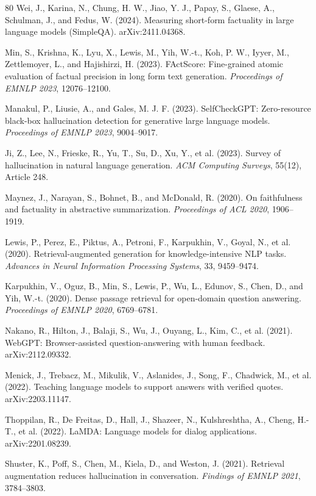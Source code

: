 \documentclass[11pt,a4paper]{article}
\begin{document}
\begin{thebibliography}{80}
Wei, J., Karina, N., Chung, H. W., Jiao, Y. J., Papay, S., Glaese, A., Schulman, J., and Fedus, W. (2024). Measuring short-form factuality in large language models (SimpleQA). arXiv:2411.04368.

Min, S., Krishna, K., Lyu, X., Lewis, M., Yih, W.-t., Koh, P. W., Iyyer, M., Zettlemoyer, L., and Hajishirzi, H. (2023). FActScore: Fine-grained atomic evaluation of factual precision in long form text generation. \textit{Proceedings of EMNLP 2023}, 12076--12100.

Manakul, P., Liusie, A., and Gales, M. J. F. (2023). SelfCheckGPT: Zero-resource black-box hallucination detection for generative large language models. \textit{Proceedings of EMNLP 2023}, 9004--9017.

Ji, Z., Lee, N., Frieske, R., Yu, T., Su, D., Xu, Y., et al. (2023). Survey of hallucination in natural language generation. \textit{ACM Computing Surveys}, 55(12), Article 248.

Maynez, J., Narayan, S., Bohnet, B., and McDonald, R. (2020). On faithfulness and factuality in abstractive summarization. \textit{Proceedings of ACL 2020}, 1906--1919.

Lewis, P., Perez, E., Piktus, A., Petroni, F., Karpukhin, V., Goyal, N., et al. (2020). Retrieval-augmented generation for knowledge-intensive NLP tasks. \textit{Advances in Neural Information Processing Systems}, 33, 9459--9474.

Karpukhin, V., Oguz, B., Min, S., Lewis, P., Wu, L., Edunov, S., Chen, D., and Yih, W.-t. (2020). Dense passage retrieval for open-domain question answering. \textit{Proceedings of EMNLP 2020}, 6769--6781.

Nakano, R., Hilton, J., Balaji, S., Wu, J., Ouyang, L., Kim, C., et al. (2021). WebGPT: Browser-assisted question-answering with human feedback. arXiv:2112.09332.

Menick, J., Trebacz, M., Mikulik, V., Aslanides, J., Song, F., Chadwick, M., et al. (2022). Teaching language models to support answers with verified quotes. arXiv:2203.11147.

Thoppilan, R., De Freitas, D., Hall, J., Shazeer, N., Kulshreshtha, A., Cheng, H.-T., et al. (2022). LaMDA: Language models for dialog applications. arXiv:2201.08239.

Shuster, K., Poff, S., Chen, M., Kiela, D., and Weston, J. (2021). Retrieval augmentation reduces hallucination in conversation. \textit{Findings of EMNLP 2021}, 3784--3803.


\end{thebibliography}
\end{document}
